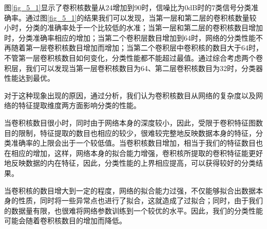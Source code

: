 图\ref{fig_5_1}显示了卷积核数量从24增加到90时，信噪比为0dB时的$7$类信号分类准确率。通过图\ref{fig_5_1}的结果我们可以发现，当第一层和第二层的卷积核数量较小时，分类的准确率处于一个比较低的水准；当第一层和第二层的卷积核数目增加时，分类准确率相应的增加；当第二个卷积层数目增加到64时，网络的分类性能不再随着第一层卷积核数目增加而增加；当第二个卷积层中卷积核的数目大于64时，不管第一层卷积核数目如何变化，分类性能都不能超过最值。通过综合考虑两个卷积层，我们可以发现当第一层卷积核数目为64、第二层卷积核数目为32时，分类器性能达到最优。\par
对于这种现象出现的原因，通过分析，我们认为卷积核数目从网络的复杂度以及网络的特征提取维度两方面影响分类的性能。\par
当卷积核数目很小时，同时由于网络本身的深度较小，因此，受限于卷积特征图数目的限制，特征提取的数目也相应的较少，很难较完整地反映数据本身的特征，分类准确率的上限会出于一个较低值。当卷积核数目增加，相当于我们的特征数目也在相应的增加，这样，网络本身的拟合能力增强，卷积核所提取的卷积特征能更好地反映数据的内在特征，因此，分类性能的上界相应提高，可以获得较好的分类结果。\par
当卷积核的数目增大到一定的程度，网络的拟合能力过强，不仅能够拟合出数据本身的性质，同时将一些异常点也进行了拟合，这就造成了过拟合；同时，由于我们的数据量有限，也很难将网络参数训练到一个较优的水平。因此，我们的分类性能可能会随着卷积核数目的增加而降低。\par

